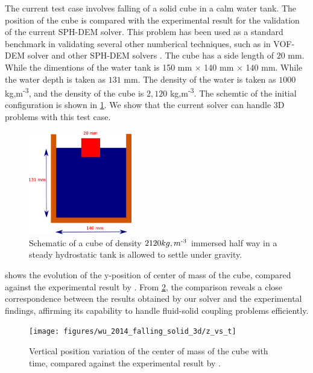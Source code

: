 \documentclass[preprint,12pt]{elsarticle}
\begin{document}
The current test case involves falling of a solid cube in a calm water
tank. The position of the cube is compared with the
experimental\cite{wu2014two} result for the validation of the current SPH-DEM
solver. This problem has been used as a standard benchmark in validating
several other numberical techniques, such as in VOF-DEM solver
\cite{nan2022cfd} and other SPH-DEM solvers \cite{qiu20173d}. The cube has a
side length of $20$ mm. While the dimentions of the water tank is 150 mm
$\times$ 140 mm $\times$ 140 mm. While the water depth is taken as $131$ mm. The density
of the water is taken as $1000$ kg,m\textsuperscript{-3}, and the density of
the cube is $2,120$ kg,m\textsuperscript{-3}. The schemtic of the initial
configuration is shown in \cref{fig:results_rfc_02_falling}. We show that the
current solver can handle 3D problems with this test case.
\begin{figure}[!htpb]
  \centering
  \includegraphics[width=0.4\textwidth]{images/rfc_02_falling_solid_in_water/schematic}
  \caption{Schematic of a cube of density $2120 kg,m\textsuperscript{-3}$
    immersed half way in a steady hydrostatic tank is allowed to settle under
    gravity.}
  \label{fig:results_rfc_02_falling}
\end{figure}



 shows the evolution of the y-position of
center of mass of the cube, compared against the experimental result by
\citet{wu2014two}. From \cref{fig:results_rfc_02_y_vs_t}, the comparison
reveals a close correspondence between the results obtained by our solver and
the experimental findings, affirming its capability to handle fluid-solid
coupling problems efficiently.
\begin{figure}[!htpb]
  \centering
  \texttt{[image: figures/wu\_2014\_falling\_solid\_3d/z\_vs\_t]}
  \caption{Vertical position variation of the center of mass of the cube with
    time, compared against the experimental result by \citet{wu2014two}.}
  \label{fig:results_rfc_02_y_vs_t}
\end{figure}
\end{document}

